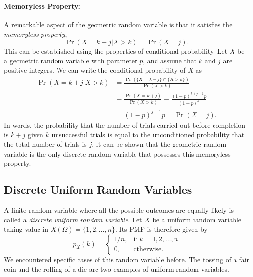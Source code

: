 \paragraph{Memoryless Property:}
A remarkable aspect of the geometric random variable is that it satisfies the \emph{memoryless property}, 
\begin{equation*}
\Pr (X = k + j | X > k) = \Pr (X = j).
\end{equation*}
This can be established using the properties of conditional probability.
Let $X$ be a geometric random variable with parameter $p$, and assume that $k$ and $j$ are positive integers.
We can write the conditional probability of $X$ as
\begin{equation*}
\begin{split}
\Pr (X = k + j | X > k)
&= \frac{\Pr( \{ X =  k + j \} \cap \{ X > k \} ) }{ \Pr ( X > k ) } \\
&= \frac{\Pr( X = k + j ) }{ \Pr ( X > k ) }
= \frac{(1 - p)^{k + j - 1} p }{ (1 - p)^k  } \\
&= (1 - p)^{j - 1} p
= \Pr (X = j).
\end{split}
\end{equation*}
In words, the probability that the number of trials carried out before completion is $k + j$ given $k$ unsuccessful trials is equal to the unconditioned probability that the total number of trials is $j$.
It can be shown that the geometric random variable is the only discrete random variable that possesses this memoryless property.


\subsection{Discrete Uniform Random Variables}

A finite random variable where all the possible outcomes are equally likely is called a \emph{discrete uniform random variable}. 
Let $X$ be a uniform random variable taking value in $X (\Omega) = \{ 1, 2, \ldots, n \}$.
Its PMF is therefore given by
\begin{equation*}
p_X (k) = \left\{ \begin{array}{ll}
1/n, & \text{if }k = 1, 2, \ldots, n \\
0, & \text{otherwise} .
\end{array} \right.
\end{equation*}
We encountered specific cases of this random variable before.
The tossing of a fair coin and the rolling of a die are two examples of uniform random variables.

